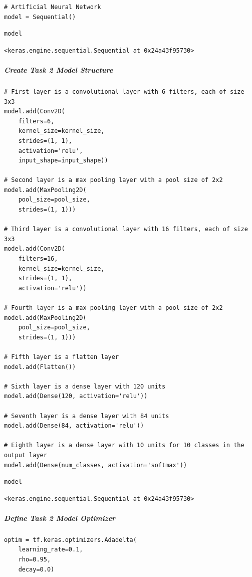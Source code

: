 \begin{verbatim}
# Artificial Neural Network
model = Sequential()
\end{verbatim}

\begin{verbatim}
model
\end{verbatim}

\begin{verbatim}
<keras.engine.sequential.Sequential at 0x24a43f95730>
\end{verbatim}

\subparagraph{Create Task 2 Model Structure}

\begin{verbatim}
# First layer is a convolutional layer with 6 filters, each of size 3x3
model.add(Conv2D(
    filters=6, 
    kernel_size=kernel_size,
    strides=(1, 1),
    activation='relu',
    input_shape=input_shape))

# Second layer is a max pooling layer with a pool size of 2x2
model.add(MaxPooling2D(
    pool_size=pool_size,
    strides=(1, 1)))

# Third layer is a convolutional layer with 16 filters, each of size 3x3
model.add(Conv2D(
    filters=16, 
    kernel_size=kernel_size,
    strides=(1, 1),
    activation='relu'))

# Fourth layer is a max pooling layer with a pool size of 2x2
model.add(MaxPooling2D(
    pool_size=pool_size,
    strides=(1, 1)))

# Fifth layer is a flatten layer
model.add(Flatten())

# Sixth layer is a dense layer with 120 units
model.add(Dense(120, activation='relu'))

# Seventh layer is a dense layer with 84 units
model.add(Dense(84, activation='relu'))

# Eighth layer is a dense layer with 10 units for 10 classes in the output layer
model.add(Dense(num_classes, activation='softmax'))
\end{verbatim}

\begin{verbatim}
model
\end{verbatim}

\begin{verbatim}
<keras.engine.sequential.Sequential at 0x24a43f95730>
\end{verbatim}

\subparagraph{Define Task 2 Model Optimizer}

\begin{verbatim}
optim = tf.keras.optimizers.Adadelta(
    learning_rate=0.1, 
    rho=0.95, 
    decay=0.0)
\end{verbatim}

